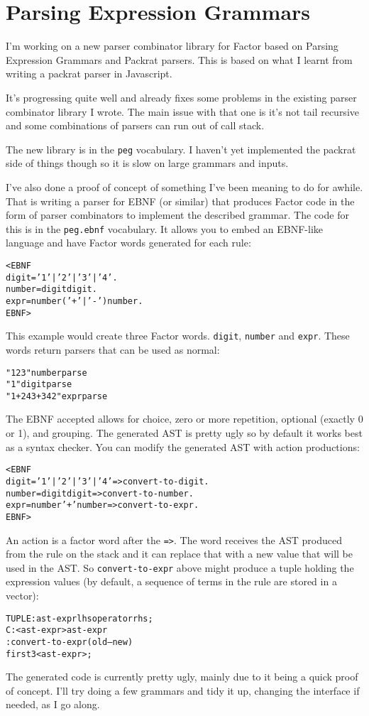 \chapter{Parsing Expression Grammars}\label{peg}

I'm working on a new parser combinator library for Factor based on
Parsing Expression Grammars and Packrat parsers. This is based on what
I learnt from writing a packrat parser in Javascript.

It's progressing quite well and already fixes some problems in the
existing parser combinator library I wrote. The main issue with that
one is it's not tail recursive and some combinations of parsers can
run out of call stack.

The new library is in the \texttt{peg} vocabulary. I haven't yet implemented
the packrat side of things though so it is slow on large grammars and
inputs.

I've also done a proof of concept of something I've been meaning to do
for awhile. That is writing a parser for EBNF (or similar) that
produces Factor code in the form of parser combinators to implement
the described grammar. The code for this is in the \texttt{peg.ebnf}
vocabulary. It allows you to embed an EBNF-like language and have
Factor words generated for each rule:
\begin{alltt}
<EBNF
digit  = '1' | '2' | '3' | '4' .
number = digit { digit } .
expr   = number {('+' | '-' ) number } .
EBNF>
\end{alltt}
This example would create three Factor words. \texttt{digit}, \texttt{number} and
\texttt{expr}. These words return parsers that can be used as normal:
\begin{alltt}
"123" number parse 
"1" digit parse
"1+243+342" expr parse
\end{alltt}
The EBNF accepted allows for choice, zero or more repetition, optional
(exactly 0 or 1), and grouping. The generated AST is pretty ugly so by
default it works best as a syntax checker. You can modify the
generated AST with action productions:
\begin{alltt}
<EBNF
digit  = '1' | '2' | '3' | '4' => convert-to-digit .
number = digit { digit }       => convert-to-number .
expr   = number '+' number     => convert-to-expr .
EBNF>
\end{alltt}
An action is a factor word after the \texttt{=>}. The word receives the AST
produced from the rule on the stack and it can replace that with a new
value that will be used in the AST. So \texttt{convert-to-expr} above might
produce a tuple holding the expression values (by default, a sequence
of terms in the rule are stored in a vector):
\begin{alltt}
TUPLE: ast-expr lhs operator rhs ;
C: <ast-expr> ast-expr
: convert-to-expr ( old -- new )
  first3 <ast-expr> ;
\end{alltt}
The generated code is currently pretty ugly, mainly due to it being a
quick proof of concept. I'll try doing a few grammars and tidy it up,
changing the interface if needed, as I go along.

